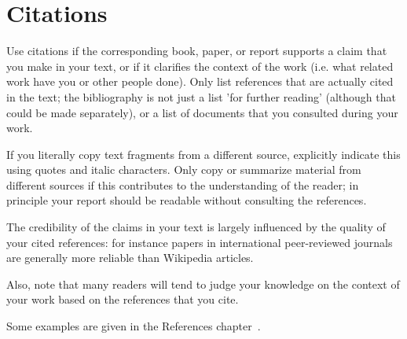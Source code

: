 \section{Citations}
\label{sec:citations}
Use citations if the corresponding book, paper, or report supports a claim that you make in your text, or if it clarifies the context of the work (i.e. what related work have you or other people done). Only list references that are actually cited in the text; the bibliography is not just a list 'for further reading' (although that could be made separately), or a list of documents that you consulted during your work. 

If you literally copy text fragments from a different source, explicitly indicate this using quotes and italic characters. Only copy or summarize material from different sources if this contributes to the understanding of the reader; in principle your report should be readable without consulting the references.

The credibility of the claims in your text is largely influenced by the quality of your cited references: for instance papers in international peer-reviewed journals are generally more reliable than Wikipedia articles. 

Also, note that many readers will tend to judge your knowledge on the context of your work based on the references that you cite. 

Some examples are given in the References chapter~\cite{TEwebsite,Cox04,Meijerink05,Meijerink10,Meijerink06,Leferink12,Meijerink12}.